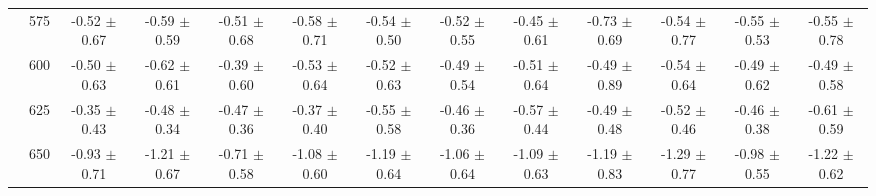 \begin{table}[h]
{\begin{tabular}{
        ccccccccccccc}
 & 575& -0.52 $\pm$ 0.67& -0.59 $\pm$ 0.59& -0.51 $\pm$ 0.68& -0.58 $\pm$ 0.71& -0.54 $\pm$ 0.50& -0.52 $\pm$ 0.55& -0.45 $\pm$ 0.61& -0.73 $\pm$ 0.69& -0.54 $\pm$ 0.77& -0.55 $\pm$ 0.53& -0.55 $\pm$ 0.78 \\ 
 & 600& -0.50 $\pm$ 0.63& -0.62 $\pm$ 0.61& -0.39 $\pm$ 0.60& -0.53 $\pm$ 0.64& -0.52 $\pm$ 0.63& -0.49 $\pm$ 0.54& -0.51 $\pm$ 0.64& -0.49 $\pm$ 0.89& -0.54 $\pm$ 0.64& -0.49 $\pm$ 0.62& -0.49 $\pm$ 0.58 \\ 
 & 625& -0.35 $\pm$ 0.43& -0.48 $\pm$ 0.34& -0.47 $\pm$ 0.36& -0.37 $\pm$ 0.40& -0.55 $\pm$ 0.58& -0.46 $\pm$ 0.36& -0.57 $\pm$ 0.44& -0.49 $\pm$ 0.48& -0.52 $\pm$ 0.46& -0.46 $\pm$ 0.38& -0.61 $\pm$ 0.59 \\ 
 & 650& -0.93 $\pm$ 0.71& -1.21 $\pm$ 0.67& -0.71 $\pm$ 0.58& -1.08 $\pm$ 0.60& -1.19 $\pm$ 0.64& -1.06 $\pm$ 0.64& -1.09 $\pm$ 0.63& -1.19 $\pm$ 0.83& -1.29 $\pm$ 0.77& -0.98 $\pm$ 0.55& -1.22 $\pm$ 0.62 \\ \hline 

        \end{tabular}%
        }

        \end{table}
        

